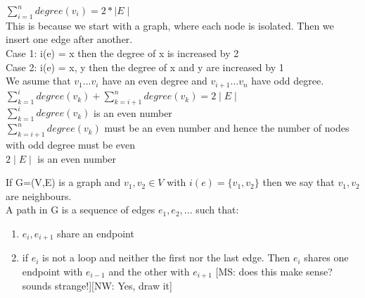 \begin{prooof}
    $\sum\limits_{i=1}^n degree(v_{i}) = 2* \mid E \mid$ \\
This is because we start with a graph, where each node is isolated. Then we insert one edge after another.\\
Case 1: i(e) = {x} then the degree of x is increased by 2\\
Case 2: i(e) = {x, y} then the degree of x and y are increased by 1\\
We asume that $v_{1}...v_{i}$ have an even degree and $v_{i+1}...v_{n}$ have odd degree.\\

$\sum\limits_{k=1}^i degree(v{_k}) + \sum\limits_{k=i+1}^n degree(v{_k}) = 2 \mid E \mid$\\

$\sum\limits_{k=1}^i degree(v{_k})$ is an even number\\

$\sum\limits_{k=i+1}^n degree(v{_k})$ must be an even number and hence the number of nodes with odd degree must be even\\

$ 2 \mid E \mid$ is an even number \\

\end{prooof}


\begin{definition}
    If G=(V,E) is a graph and $v{_1}, v{_2} \in V$ with $i(e) = \{v_1, v_2\}$ then we say that $v{_1}, v{_2}$ are neighbours. \\
    A path in G is a sequence of edges $e{_1}, e{_2}, ...$ such that: \\
\begin{enumerate}
\item $e{_i}, e_{i+1}$ share an endpoint
\item if $e{_i}$ is not a loop and neither the first nor the last edge. Then $e{_i}$ shares one endpoint with $e_{i-1}$ and the other with $e_{i+1}$ [MS: does this make sense? sounds strange!][NW: Yes, draw it]
\end{enumerate}
\end{definition}

